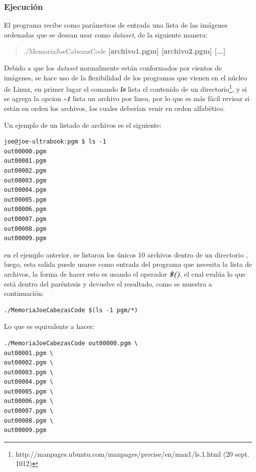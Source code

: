 \subsubsection{Ejecución}
\label{ch:propuesta:sec:extraccionDeLaSuperficie:subsec:ejecucion}

El programa recibe como parámetros de entrada una lista de las imágenes ordenadas que se desean usar como \emph{dataset}, de la siguiente manera:

\begin{quote}
./MemoriaJoeCabezasCode \textbf{[archivo1.pgm] [archivo2.pgm] [...]}
\end{quote}

Debido a que los \emph{dataset} normalmente están conformados por cientos de imágenes, se hace uso de la flexibilidad de los programas que vienen en el núcleo de Linux, en primer lugar el comando \textbf{\emph{ls}} lista el contenido de un directorio\footnote{http://manpages.ubuntu.com/manpages/precise/en/man1/ls.1.html (20 sept. 1012)}, y si se agrega la opcion \textbf{\emph{-1}} lista un archivo por linea, por lo que es más fácil revisar si están en orden los archivos, los cuales deberían venir en orden alfabético.

Un ejemplo de un listado de archivos es el siguiente:

\begin{small}
\begin{verbatim}
joe@joe-ultrabook:pgm $ ls -1
out00000.pgm
out00001.pgm
out00002.pgm
out00003.pgm
out00004.pgm
out00005.pgm
out00006.pgm
out00007.pgm
out00008.pgm
out00009.pgm
\end{verbatim}
\end{small}

en el ejemplo anterior, se listaron los únicos 10 archivos dentro de un directorio , luego, esta salida puede usarse como entrada del programa que necesita la lista de archivos, la forma de hacer esto es usando el operador \textbf{\emph{\$()}}, el cual evalúa lo que está dentro del paréntesis y devuelve el resultado, como se muestra a continuación:

\begin{small}
\begin{verbatim}
./MemoriaJoeCabezasCode $(ls -1 pgm/*)
\end{verbatim}
\end{small}

\newpage
Lo que es equivalente a hacer:

\begin{small}
\begin{verbatim}
./MemoriaJoeCabezasCode out00000.pgm \
out00001.pgm \
out00002.pgm \
out00003.pgm \
out00004.pgm \
out00005.pgm \
out00006.pgm \
out00007.pgm \
out00008.pgm \
out00009.pgm
\end{verbatim}
\end{small}

